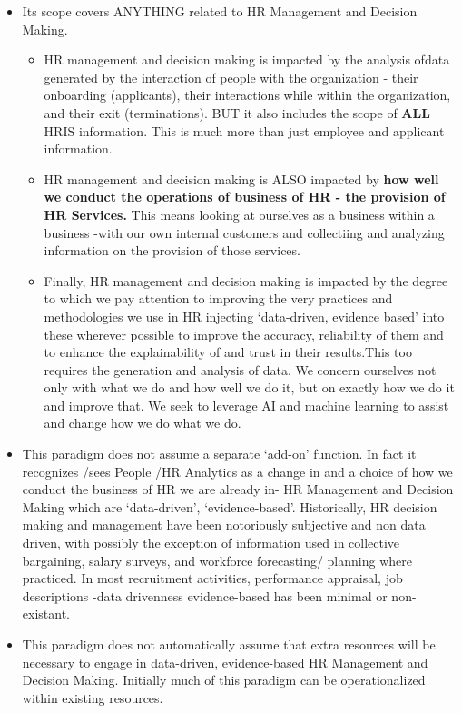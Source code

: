 \documentclass[12pt,letterpaper]{article}
\begin{document}
\begin{itemize}
\item
  Its scope covers ANYTHING related to HR Management and Decision
  Making.

  \begin{itemize}
  \item
    HR management and decision making is impacted by the 
    analysis ofdata generated by the interaction of people 
    with the organization - their onboarding (applicants), 
    their interactions while within the organization,
    and their exit (terminations). BUT it also includes
    the scope of \textbf{ALL} HRIS information. 
    This is much more than just employee and applicant information.
  \item
    HR management and decision making is ALSO impacted by \textbf{how
    well we conduct the operations of business of HR - the provision of
    HR Services.} This means looking at ourselves as a business within a
    business -with our own internal customers and collectiing and
    analyzing information on the provision of those services.
  \item
    Finally, HR management and decision making is impacted by the degree
    to which we pay attention to improving the very practices and
    methodologies we use in HR injecting `data-driven, evidence based'
    into these wherever possible to improve the accuracy, reliability of
    them and to enhance the explainability of and trust in their
    results.This too requires the generation and analysis of data. We
    concern ourselves not only with what we do and how well we do it,
    but on exactly how we do it and improve that. We seek to leverage AI
    and machine learning to assist and change how we do what we do.
  \end{itemize}
\item
  This paradigm does not assume a separate `add-on' function. In fact it
  recognizes /sees People /HR Analytics as a change in and a choice of
  how we conduct the business of HR we are already in- HR Management and
  Decision Making which are `data-driven', `evidence-based'.
  Historically, HR decision making and management have been notoriously
  subjective and non data driven, with possibly the exception of
  information used in collective bargaining, salary surveys, and
  workforce forecasting/ planning where practiced. In most recruitment
  activities, performance appraisal, job descriptions -data drivenness
  evidence-based has been minimal or non-existant.
\item
  This paradigm does not automatically assume that extra resources will
  be necessary to engage in data-driven, evidence-based HR Management
  and Decision Making. Initially much of this paradigm can be
  operationalized within existing resources.
\end{itemize}
\end{document}
